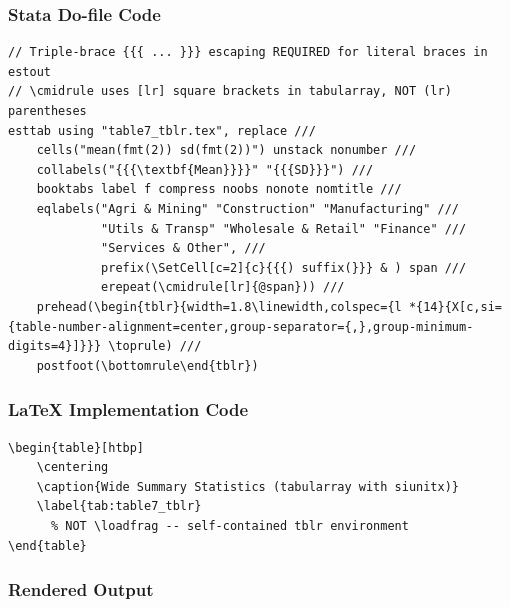 \documentclass[11pt]{article}
\numberwithin{table}{section}
\newcommand{\loadfrag}[1]{%
	\begin{filecontents*}{#1}%
	\end{filecontents*}%
	\CatchFileDef{\mytable}{#1}{}%
}
\begin{document}
\subsubsection{Stata Do-file Code}
\begin{lstlisting}[style=stata]
// Triple-brace {{{ ... }}} escaping REQUIRED for literal braces in estout
// \cmidrule uses [lr] square brackets in tabularray, NOT (lr) parentheses
esttab using "table7_tblr.tex", replace ///
    cells("mean(fmt(2)) sd(fmt(2))") unstack nonumber ///
    collabels("{{{\textbf{Mean}}}}" "{{{SD}}}") ///
    booktabs label f compress noobs nonote nomtitle ///
    eqlabels("Agri & Mining" "Construction" "Manufacturing" ///
             "Utils & Transp" "Wholesale & Retail" "Finance" ///
             "Services & Other", ///
             prefix(\SetCell[c=2]{c}{{{) suffix(}}} & ) span ///
             erepeat(\cmidrule[lr]{@span})) ///
    prehead(\begin{tblr}{width=1.8\linewidth,colspec={l *{14}{X[c,si={table-number-alignment=center,group-separator={,},group-minimum-digits=4}]}}} \toprule) ///
    postfoot(\bottomrule\end{tblr})
\end{lstlisting}

\subsubsection{LaTeX Implementation Code}
\begin{lstlisting}[style=latex]
\begin{table}[htbp]
    \centering
    \caption{Wide Summary Statistics (tabularray with siunitx)}
    \label{tab:table7_tblr}
      % NOT \loadfrag -- self-contained tblr environment
\end{table}
\end{lstlisting}

\subsubsection{Rendered Output}
\begin{table}[htbp]
    \centering
    \caption{Wide Summary Statistics (tabularray with siunitx)}
    \label{tab:table7_tblr_render}
    
\end{table}
\end{document}
